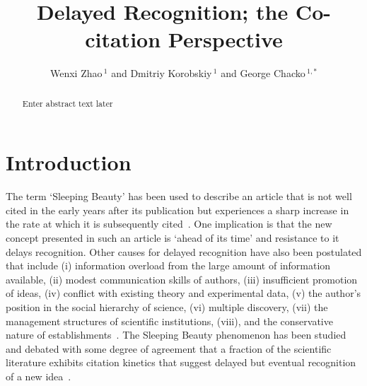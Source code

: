 \documentclass[utf8]{frontiersSCNS}
\def\firstAuthorLast{Zhao {et~al.}} %
\def\Authors{Wenxi Zhao\,$^{1}$ and Dmitriy Korobskiy\,$^{1}$  and George Chacko\,$^{1,*}$} %
\begin{document}
\onecolumn
{}

\title[Delayed Co-citations]{Delayed Recognition; the Co-citation Perspective} 

\author[\firstAuthorLast ]{\Authors} %
\address{} %
\correspondance{} %

\extraAuth{}%

\maketitle

\begin{abstract}
Enter abstract text later
\end{abstract}

\section{Introduction}

The term `Sleeping Beauty' has been used to describe an article that is not well cited in the early years after its publication but experiences a sharp increase in the rate at which it is subsequently cited~\citep{Raan2004}. One implication is that the new concept presented in such an article is `ahead of its time' and resistance to it delays recognition. Other causes for delayed recognition have also been postulated that include (i) information overload from the large amount of information available, (ii)  modest communication skills of authors, (iii) insufficient promotion of ideas, (iv) conflict with existing theory and experimental data, (v) the author's position in the social hierarchy of science, (vi)  multiple discovery, (vii) the management structures of scientific institutions, (viii), and the conservative nature of establishments~\citep{Barber1961,Merton1963,Cole1970,Garfield1970a,Garfield1980a}. The Sleeping Beauty phenomenon has been studied and debated with some degree of agreement that a fraction of the scientific literature exhibits citation kinetics that suggest delayed but eventual recognition of a new idea~\citep{Glanzel2003,Glanzel2004,redner_2005,Braun_2010,Li2014,Ke2015,Li2016,Song2018,sugimoto_mostafa_2018,ye_bornmann_2018}. 
\end{document}
